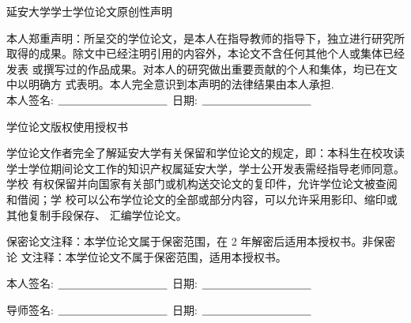 

\newpage
\vspace*{20pt}
\begin{center}
	{\heiti{}延安大学学士学位论文原创性声明}
\end{center}
\par%
\renewcommand{\baselinestretch}{2}

{%

本人郑重声明：所呈交的学位论文，是本人在指导教师的指导下，独立进行研究所 取得的成果。除文中已经注明引用的内容外，本论文不含任何其他个人或集体已经发表 或撰写过的作品成果。对本人的研究做出重要贡献的个人和集体，均已在文中以明确方 式表明。本人完全意识到本声明的法律结果由本人承担.\\[1cm]
\hspace*{1cm}本人签名: $\underline{\hspace{3.5cm}}$
\hspace{2cm}日期: $\underline{\hspace{3.5cm}}$\hfill\par}
\vskip10mm
\begin{center}
	{\heiti{}学位论文版权使用授权书}
\end{center}

{%
	
学位论文作者完全了解延安大学有关保留和学位论文的规定，即：本科生在校攻读 学士学位期间论文工作的知识产权属延安大学，学士公开发表需经指导老师同意。学校 有权保留并向国家有关部门或机构送交论文的复印件，允许学位论文被查阅和借阅；学 校可以公布学位论文的全部或部分内容，可以允许采用影印、缩印或其他复制手段保存、 汇编学位论文。

保密论文注释：本学位论文属于保密范围，在 2 年解密后适用本授权书。非保密论 文注释：本学位论文不属于保密范围，适用本授权书。

	
	\hspace*{1cm}本人签名: $\underline{\hspace{3.5cm}}$
	\hspace{2cm}日期: $\underline{\hspace{3.5cm}}$\hfill\par 
	\vskip5mm
	\hspace*{1cm}导师签名: $\underline{\hspace{3.5cm}}$
	\hspace{2cm}日期: $\underline{\hspace{3.5cm}}$\hfill\par}
\baselineskip=23pt  %






